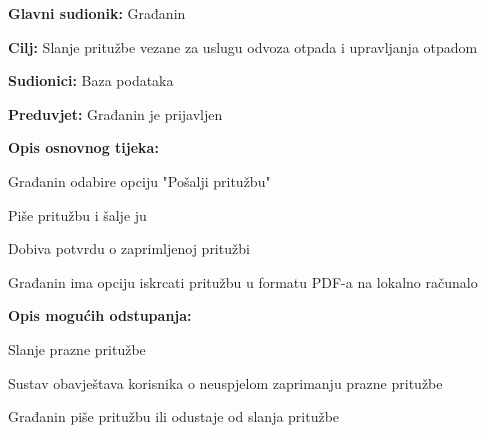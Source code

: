 				\noindent {}
				\begin{packed_item}
					
					\item \textbf{Glavni sudionik: }Građanin
					\item  \textbf{Cilj:} Slanje pritužbe vezane za uslugu odvoza otpada i upravljanja otpadom
					\item  \textbf{Sudionici:} Baza podataka
					\item  \textbf{Preduvjet:} Građanin je prijavljen
					\item  \textbf{Opis osnovnog tijeka:}
					
					\item[] \begin{packed_enum}
						\item Građanin odabire opciju "Pošalji pritužbu"
						\item Piše pritužbu i šalje ju
						\item Dobiva potvrdu o zaprimljenoj pritužbi
						\item Građanin ima opciju iskrcati pritužbu u formatu PDF-a na lokalno računalo
					\end{packed_enum}
					
					\item  \textbf{Opis mogućih odstupanja:}
					
					\item[] \begin{packed_item}
						
						\item[2.a] Slanje prazne pritužbe
						\item[] \begin{packed_enum}
							
							\item Sustav obavještava korisnika o neuspjelom zaprimanju prazne pritužbe
							\item Građanin piše pritužbu ili odustaje od slanja pritužbe
							
						\end{packed_enum}
						
						
					\end{packed_item}
				\end{packed_item}
			
				\newpage
			
